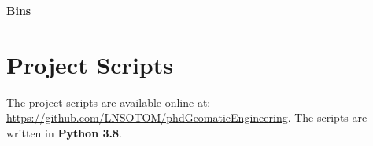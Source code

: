 \documentclass{thesis}
\begin{document}
\textbf{Bins}

\begin{figure}[h!]
	\centering
\end{figure}


\clearpage
\section{Project Scripts}\label{app:scripts}

The project scripts are available online at:
\newline
\url{https://github.com/LNSOTOM/phdGeomaticEngineering}. 
\newline
The scripts are written in \textbf{Python 3.8}.
\end{document}
